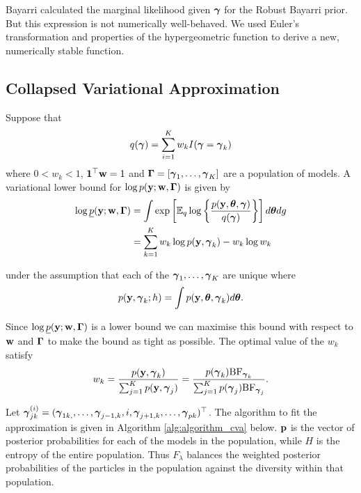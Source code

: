 Bayarri calculated the marginal likelihood given ${\boldsymbol \gamma}$ for the Robust Bayarri prior.
But this expression is not numerically well-behaved.
We used Euler's transformation and properties of the hypergeometric function to derive a new,
numerically stable function.


\subsection{Collapsed Variational Approximation}

Suppose that
\[
	q({\boldsymbol \gamma}) = \sum_{i=1}^K w_k I({\boldsymbol \gamma} = {\boldsymbol \gamma}_k)
\]
where $0 < w_k < 1$, ${\bf 1}^\top {\bf w} = 1$ and ${\boldsymbol \Gamma} = [{\boldsymbol \gamma}_1, \ldots, {\boldsymbol \gamma}_K]$ are a population of
models. A variational lower bound for $\log p({\bf y}; {\bf w}, {\boldsymbol \Gamma})$ is given by
\begin{align*}
	\log \underline{p}({\bf y}; {\bf w}, {\boldsymbol \Gamma}) &= \int \exp\left[ {\mathbb E}_q \log \left\{ \frac{p({\bf y}, {\boldsymbol \theta}, {\boldsymbol \gamma})}{q({\boldsymbol \gamma})} \right\} \right] d {\boldsymbol \theta} dg \\
	&= \sum_{k=1}^K w_k \log p({\bf y}, {\boldsymbol \gamma}_k) - w_k \log w_k
\end{align*}

under the assumption that each of the ${\boldsymbol \gamma}_1, \ldots, {\boldsymbol \gamma}_K$ are unique where
\[
	p({\bf y}, {\boldsymbol \gamma}_k; h) = \int p({\bf y}, {\boldsymbol \theta}, {\boldsymbol \gamma}_k) d {\boldsymbol \theta}.
\]

Since $\log \underline{p}({\bf y}; {\bf w}, {\boldsymbol \Gamma})$ is a lower bound we can maximise this bound with respect to
${\bf w}$ and ${\boldsymbol \Gamma}$ to make the bound as tight as possible. The optimal value of the $w_k$ satisfy
\begin{align*}
	w_k = \frac{p({\bf y}, {\boldsymbol \gamma}_k)}{\sum_{j=1}^K p({\bf y}, {\boldsymbol \gamma}_j)} = \frac{p({\boldsymbol \gamma}_k) \text{BF}_{{\boldsymbol \gamma}_k}}{\sum_{j=1}^K p({\boldsymbol \gamma}_j) \text{BF}_{{\boldsymbol \gamma}_j}}.
\end{align*}

Let ${\boldsymbol \gamma}_{jk}^{(i)} = ({\boldsymbol \gamma}_{1k, }, \ldots, {\boldsymbol \gamma}_{j-1, k}, i, {\boldsymbol \gamma}_{j+1, k}, \ldots,
{\boldsymbol \gamma}_{pk})^\top$. The algorithm to fit the approximation is given in Algorithm \ref{alg:algorithm_cva}
below. ${\bf p}$ is the vector of posterior probabilities for each of the models in the population, while $H$ is
the entropy of the entire population. Thus $F_\lambda$ balances the weighted posterior probabilities of the
particles in the population against the diversity within that population.


